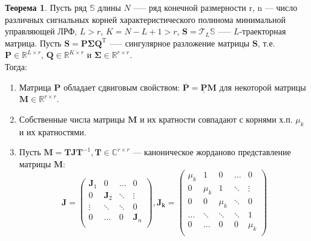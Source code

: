 \documentclass[specialist, substylefile = spbureport.rtx, subf,href,colorlinks=true, 12pt]{disser}
\theoremstyle{definition}
\newtheorem{theorem}{Теорема}
\begin{document}
\begin{theorem}
\label{th4}
Пусть ряд $\mathbb{S}$ длины $N$ --— ряд конечной размерности r, n --- число различных сигнальных корней характеристического полинома минимальной управляющей ЛРФ, $L > r$, $K = N - L + 1 > r$, $\mathbf{S} = \mathcal{T}_L\mathbb{S}$ --— $L$-траекторная матрица. Пусть $\mathbf{S} = \mathbf{P\Sigma Q}^{\mathrm{T}}$ --— сингулярное разложение матрицы $\mathbf{S}$, т.е. $\mathbf{P} \in \mathbb{R}^{L \times r}$, $\mathbf{Q} \in \mathbb{R}^{K \times r}$ и $\mathbf{\Sigma} \in \mathbb{R}^{r \times r}$. \\
    \hspace*{0.5cm} Тогда:
    \begin{enumerate}
        \item Матрица $\mathbf{P}$ обладает сдвиговым свойством: $\overline{\mathbf{P}} = \underline{\mathbf{P}}\mathbf{M}$ для некоторой матрицы $\mathbf{M} \in \mathbb{R}^{r \times r}$.
        \item Собственные числа матрицы $\mathbf{M}$ и их кратности совпадают с корнями х.п. $\mu_k$ и их кратностями.
        \item Пусть $\mathbf{M} = \mathbf{TJ}\mathbf{T}^{-1}, \mathbf{T} \in \mathbb{C}^{r \times r}$ --- каноническое жорданово представление матрицы $\mathbf{M}$:
        \begin{equation*}
            \mathbf{J} = \begin{pmatrix}
                    \mathbf{J}_1 & 0 & \ldots & 0\\
                    0 & \mathbf{J}_2 & \ddots & \vdots \\
                    \vdots & \ddots & \ddots & 0 \\
                    0 & \ldots & 0 & \mathbf{J}_n \\
                    \end{pmatrix},
            \mathbf{J_k} =         \begin{pmatrix}
                    \mu_k & 1 & 0 & \ldots & 0 \\
                    0 & \mu_k & 1 & \ddots & \vdots \\
                    0 & 0 & \mu_k & \ddots & 0 \\
                    \ldots & \ddots & \ddots & \ddots & 1 \\
                    0 & \ldots & 0 & 0 & \mu_k \\
                    \end{pmatrix}
        \end{equation*}

\end{enumerate}
\end{theorem}
\end{document}
